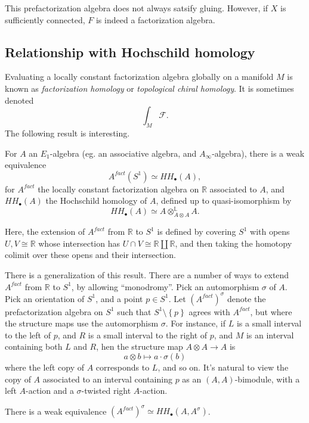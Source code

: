 This prefactorization algebra does not always satsify gluing. However, if $X$ is sufficiently connected, $F$ is indeed a factorization algebra.

\subsection{Relationship with Hochschild homology}

Evaluating a locally constant factorization algebra globally on a manifold $M$ is known as \emph{factorization homology} or \emph{topological chiral homology}. It is sometimes denoted
\[
	\int_{M} \mathcal{F} 
.\]
The following result is interesting.

\begin{theorem}\label{thm:4-6-3}
	For $A$ an $E_1$-algebra (eg. an associative algebra, and $A_\infty $-algebra), there is a weak equivalence
	\[
		A^{fact} (S^1)\simeq HH_{\bullet} (A),
	\]
	for $A^{fact} $ the locally constant factorization algebra on $\mathbb{R} $ associated to $A$, and $H H_{\bullet} (A)$ the Hochschild homology of $A$, defined up to quasi-isomorphism by
	\[
		H H_{\bullet} (A) \simeq A\otimes_{A\otimes A} ^{\mathbb{L}} A
	.\]
\end{theorem}

Here, the extension of $A^{fact} $ from $\mathbb{R} $ to $S^1$ is defined by covering $S^1$ with opens $U,V \cong \mathbb{R} $ whose intersection has $U \cap V \cong \mathbb{R} \amalg \mathbb{R} $, and then taking the homotopy colimit over these opens and their intersection.

There is a generalization of this result. There are a number of ways to extend $A^{fact} $ from $\mathbb{R} $ to $S^1$, by allowing ``monodromy''. Pick an automorphism $\sigma $ of $A$. Pick an orientation of $S^1$, and a point $p\in S^1$. Let $(A^{fact} )^{\sigma } $ denote the prefactorization algebra on $S^1$ such that $S^1\setminus \left\{ p \right\} $ agrees with $A^{fact} $, but where the structure maps use the automorphism $\sigma $. For instance, if $L$ is a small interval to the left of $p$, and $R$ is a small interval to the right of $p$, and $M$ is an interval containing both $L$ and $R$, hen the structure map $A\otimes A\to A$ is
\[
	a\otimes b\mapsto a\cdot \sigma (b)
\]
where the left copy of $A$ corresponds to $L$, and so on. It's natural to view the copy of $A$ associated to an interval containing $p$ as an $(A,A)$-bimodule, with a left $A$-action and a $\sigma $-twisted right $A$-action.

\begin{theorem}\label{thm:6-4-4}
	There is a weak equivalence $(A^{fact} )^{\sigma } \simeq H H_{\bullet} (A,A^{\sigma } )$.
\end{theorem}


